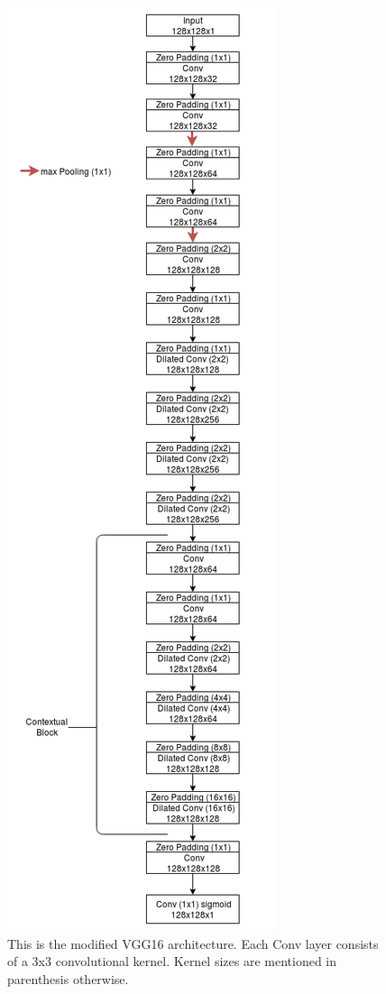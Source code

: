 \begin{figure}[tbh]
\centering
\includegraphics[height=\textheight]{model_VGG16.png}
\caption{ This is the modified VGG16 architecture. Each Conv layer consists of a 3x3 convolutional kernel. Kernel sizes are mentioned in parenthesis otherwise.}
\label{fig_modvgg16}
\end{figure}
 

